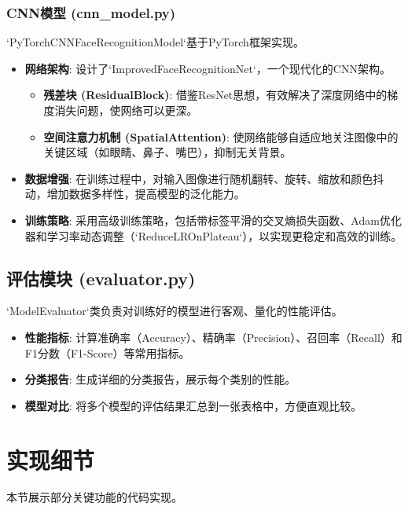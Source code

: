 \documentclass[a4paper]{article}
\begin{document}
\subsubsection{CNN模型 (cnn\_model.py)}
`PyTorchCNNFaceRecognitionModel`基于PyTorch框架实现。
\begin{itemize}
    \item \textbf{网络架构}: 设计了`ImprovedFaceRecognitionNet`，一个现代化的CNN架构。
    \begin{itemize}
        \item \textbf{残差块 (ResidualBlock)}: 借鉴ResNet思想，有效解决了深度网络中的梯度消失问题，使网络可以更深。
        \item \textbf{空间注意力机制 (SpatialAttention)}: 使网络能够自适应地关注图像中的关键区域（如眼睛、鼻子、嘴巴），抑制无关背景。
    \end{itemize}
    \item \textbf{数据增强}: 在训练过程中，对输入图像进行随机翻转、旋转、缩放和颜色抖动，增加数据多样性，提高模型的泛化能力。
    \item \textbf{训练策略}: 采用高级训练策略，包括带标签平滑的交叉熵损失函数、Adam优化器和学习率动态调整（`ReduceLROnPlateau`），以实现更稳定和高效的训练。
\end{itemize}

\subsection{评估模块 (evaluator.py)}
`ModelEvaluator`类负责对训练好的模型进行客观、量化的性能评估。
\begin{itemize}
    \item \textbf{性能指标}: 计算准确率（Accuracy）、精确率（Precision）、召回率（Recall）和F1分数（F1-Score）等常用指标。
    \item \textbf{分类报告}: 生成详细的分类报告，展示每个类别的性能。
    \item \textbf{模型对比}: 将多个模型的评估结果汇总到一张表格中，方便直观比较。
\end{itemize}

\section{实现细节}
本节展示部分关键功能的代码实现。
\end{document}
